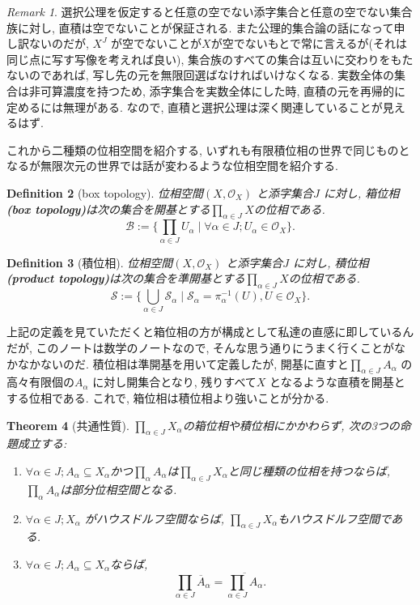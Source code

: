 \documentclass[lualatex]{ltjsbook}
\newcommand{\cl}[1]{\overline{ #1}  }
\newtheorem{theorem}{Theorem}[chapter]
\newtheorem{definition}[theorem]{Definition}
\theoremstyle{remark}
\newtheorem{remark}[theorem]{Remark}
\theoremstyle{plain}
\begin{document}
\begin{remark}
選択公理を仮定すると任意の空でない添字集合と任意の空でない集合族に対し,  直積は空でないことが保証される. また公理的集合論の話になって申し訳ないのだが,  $X^J$ が空でないことが$X$が空でないもとで常に言えるが(それは同じ点に写す写像を考えれば良い),  集合族のすべての集合は互いに交わりをもたないのであれば,  写し先の元を無限回選ばなければいけなくなる. 実数全体の集合は非可算濃度を持つため,  添字集合を実数全体にした時,  直積の元を再帰的に定めるには無理がある. なので,  直積と選択公理は深く関連していることが見えるはず.
\end{remark}

これから二種類の位相空間を紹介する,  いずれも有限積位相の世界で同じものとなるが無限次元の世界では話が変わるような位相空間を紹介する.

\begin{definition}[box topology]
	位相空間$\left( X, \mathcal{O}_X \right) $ と添字集合$J$ に対し,  箱位相 \textbf{(box topology)}は次の集合を開基とする$\prod_{\alpha \in J}X$の位相である. 
	 \[
	\mathcal{B}:=\{\prod_{\alpha \in J}U_{\alpha}  \mid \forall \alpha \in J; U_{\alpha} \in \mathcal{O}_X\} 
	.\] 
\end{definition}

\begin{definition}[積位相]

	位相空間$\left( X, \mathcal{O}_X \right) $ と添字集合$J$ に対し,  積位相 \textbf{(product topology)}は次の集合を準開基とする$\prod_{\alpha \in J}X$の位相である. 
	\[
	\mathcal{S}:=\{\bigcup_{\alpha \in J}\mathcal{S}_{\alpha} \mid \mathcal{S}_{\alpha}= \pi_{\alpha}^{-1} \left( U \right)  ,  U \in \mathcal{O}_X \} 
	.\] 
\end{definition}

上記の定義を見ていただくと箱位相の方が構成として私達の直感に即しているんだが,  このノートは数学のノートなので,  そんな思う通りにうまく行くことがなかなかないのだ.
積位相は準開基を用いて定義したが,  開基に直すと$\prod_{\alpha \in J} A_{\alpha}  $ の高々有限個の$A_{\alpha}$ に対し開集合となり,  残りすべて$X$ となるような直積を開基とする位相である. 
これで,  箱位相は積位相より強いことが分かる. 

\begin{theorem}[共通性質]
	$\prod_{\alpha \in J} X_{\alpha}  $の箱位相や積位相にかかわらず,  次の3つの命題成立する:
	\begin{enumerate}
		\item $\forall \alpha \in J; A_{\alpha} \subseteq X_{\alpha} $かつ$\prod_{\alpha} A_{\alpha}  $は$\prod_{\alpha \in J} X_{\alpha}  $と同じ種類の位相を持つならば,  $\prod_{\alpha} A_{\alpha}  $は部分位相空間となる.
		\item $\forall \alpha \in J; X_{\alpha}$ がハウスドルフ空間ならば,  $\prod_{\alpha \in J} X_{\alpha}  $もハウスドルフ空間である.
		\item $\forall \alpha \in J; A_{\alpha} \subseteq X_{\alpha}$ならば,  
			\[
			\prod_{\alpha \in J} \cl{A}_{\alpha} = \cl{\prod_{\alpha \in J} A_{\alpha}}    
			.\] 
	\end{enumerate}
\end{theorem}
\end{document}
